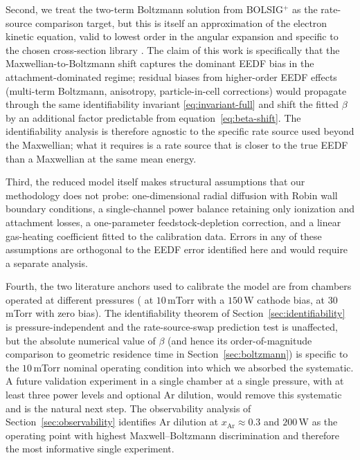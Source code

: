Second, we treat the two-term Boltzmann solution from BOLSIG$^+$ as
the rate-source comparison target, but this is itself an
approximation of the electron kinetic equation, valid to lowest
order in the angular expansion and specific to the chosen
cross-section library \citep{biagi}. The claim of this work is
specifically that the Maxwellian-to-Boltzmann shift captures the
dominant EEDF bias in the attachment-dominated regime; residual
biases from higher-order EEDF effects (multi-term Boltzmann,
anisotropy, particle-in-cell corrections) would propagate through
the same identifiability invariant \eqref{eq:invariant-full} and
shift the fitted $\beta$ by an additional factor predictable from
equation~\eqref{eq:beta-shift}. The identifiability analysis is
therefore agnostic to the specific rate source used beyond the
Maxwellian; what it requires is a rate source that is closer to
the true EEDF than a Maxwellian at the same mean energy.

Third, the reduced model itself makes structural assumptions that
our methodology does not probe: one-dimensional radial diffusion
with Robin wall boundary conditions, a single-channel power
balance retaining only ionization and attachment losses, a
one-parameter feedstock-depletion correction, and a linear
gas-heating coefficient fitted to the calibration data. Errors in
any of these assumptions are orthogonal to the EEDF error
identified here and would require a separate analysis.

Fourth, the two literature anchors used to calibrate the model are
from chambers operated at different pressures
(\citet{mansano1999} at $10\,$mTorr with a $150\,$W cathode bias,
\citet{panduranga2019} at $30\,$mTorr with zero bias). The
identifiability theorem of
Section~\ref{sec:identifiability} is pressure-independent and the
rate-source-swap prediction test is unaffected, but the absolute
numerical value of $\beta$ (and hence its order-of-magnitude
comparison to geometric residence time in
Section~\ref{sec:boltzmann}) is specific to the $10\,$mTorr
nominal operating condition into which we absorbed the systematic.
A future validation experiment in a single chamber at a single
pressure, with at least three power levels and optional Ar
dilution, would remove this systematic and is the natural next
step. The observability analysis of
Section~\ref{sec:observability} identifies Ar dilution at
$x_{\mathrm{Ar}} \approx 0.3$ and $200\,$W as the operating point
with highest Maxwell--Boltzmann discrimination and therefore the
most informative single experiment.

